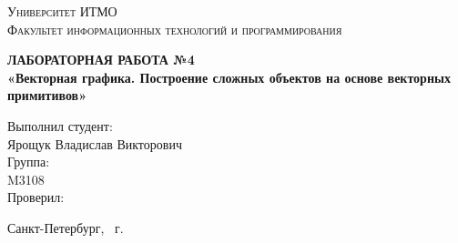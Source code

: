 \begin{titlepage}
\begin{center}
\textsc{
Университет ИТМО\\[3mm]
Факультет информационных технологий и программирования}

\vfill

\textbf{
ЛАБОРАТОРНАЯ РАБОТА №4\\[3mm]
«Векторная графика. Построение сложных объектов на основе векторных примитивов»\\[20mm]}
\end{center}

\hfill
\begin{minipage}{.5\textwidth}
Выполнил студент:\\[2mm] 
Ярощук Владислав Викторович\\[4mm]
Группа:\\[2mm]
M3108\\[5mm]

Проверил:\\[7mm] 
\end{minipage}%
\vfill
\begin{center}
Санкт-Петербург, \theyear\ г.
\end{center}
\end{titlepage}
